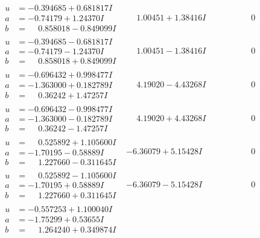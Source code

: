 \documentclass[1p]{elsarticle_modified}
\theoremstyle{definition}
\begin{document}
$$\begin{array}{c|c|c}
\begin{aligned}
u &= -0.394685 + 0.681817 I \\
a &= -0.74179 + 1.24370 I \\
b &= \phantom{-}0.858018 - 0.849099 I\end{aligned}
 & \phantom{-}1.00451 + 1.38416 I & \phantom{-0.000000 } 0 \\ \hline\begin{aligned}
u &= -0.394685 - 0.681817 I \\
a &= -0.74179 - 1.24370 I \\
b &= \phantom{-}0.858018 + 0.849099 I\end{aligned}
 & \phantom{-}1.00451 - 1.38416 I & \phantom{-0.000000 } 0 \\ \hline\begin{aligned}
u &= -0.696432 + 0.998477 I \\
a &= -1.363000 + 0.182789 I \\
b &= \phantom{-}0.36242 + 1.47257 I\end{aligned}
 & \phantom{-}4.19020 - 4.43268 I & \phantom{-0.000000 } 0 \\ \hline\begin{aligned}
u &= -0.696432 - 0.998477 I \\
a &= -1.363000 - 0.182789 I \\
b &= \phantom{-}0.36242 - 1.47257 I\end{aligned}
 & \phantom{-}4.19020 + 4.43268 I & \phantom{-0.000000 } 0 \\ \hline\begin{aligned}
u &= \phantom{-}0.525892 + 1.105600 I \\
a &= -1.70195 - 0.58889 I \\
b &= \phantom{-}1.227660 - 0.311645 I\end{aligned}
 & -6.36079 + 5.15428 I & \phantom{-0.000000 } 0 \\ \hline\begin{aligned}
u &= \phantom{-}0.525892 - 1.105600 I \\
a &= -1.70195 + 0.58889 I \\
b &= \phantom{-}1.227660 + 0.311645 I\end{aligned}
 & -6.36079 - 5.15428 I & \phantom{-0.000000 } 0 \\ \hline\begin{aligned}
u &= -0.557253 + 1.100040 I \\
a &= -1.75299 + 0.53655 I \\
b &= \phantom{-}1.264240 + 0.349874 I\end{aligned}

\end{array}$$
\end{document}
